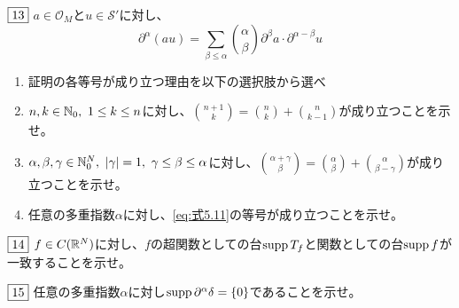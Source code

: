 \documentclass[dvipdfmx, leqno]{jsreport}
\begin{document}
\begin{tcolorbox}$\fbox{13}$
    $a\in \mathcal{O}_M$と$u\in \mathcal{S}'$に対し、
\begin{equation}\label{eq:式5.11}
    \partial^\alpha(au)= \sum_{\beta\le \alpha}\binom{\alpha}{\beta}\partial^\beta a\cdot \partial^{\alpha- \beta}u
\end{equation}
\begin{enumerate}
    \item 証明の各等号が成り立つ理由を以下の選択肢から選べ
    \item $n, k\in \mathbb{N}_0,\ 1\le k\le n$に対し、$\binom{n+1}{k}= \binom{n}{k}+ \binom{n}{k- 1}$が成り立つことを示せ。
    \item $\alpha, \beta, \gamma\in \N^N_0,\ |\gamma|= 1,\ \gamma\le \beta\le \alpha$に対し、$\binom{\alpha+ \gamma}{\beta}= \binom{\alpha}{\beta}+ \binom{\alpha}{\beta- \gamma}$が成り立つことを示せ。
    \item 任意の多重指数$\alpha$に対し、\eqref{eq:式5.11}の等号が成り立つことを示せ。
\end{enumerate}
\end{tcolorbox}
\begin{tcolorbox}$\fbox{14}$
    $f\in C(\mathbb{R}^N)$に対し、$f$の超関数としての台$\operatorname{supp}{T_f}$と関数としての台$\operatorname{supp}{f}$が一致することを示せ。
\end{tcolorbox}
\begin{tcolorbox}$\fbox{15}$
    任意の多重指数$\alpha$に対し$\operatorname{supp}{\partial^\alpha}\delta= \{0\}$であることを示せ。
\end{tcolorbox}
\end{document}
